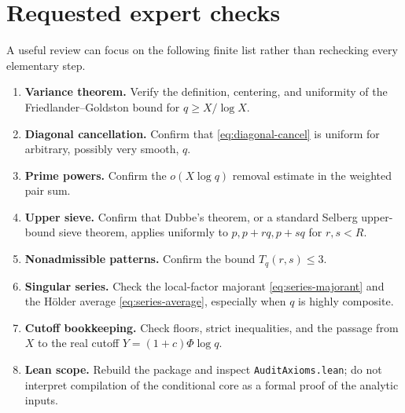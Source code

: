 \documentclass[11pt]{article}
\theoremstyle{definition}
\theoremstyle{remark}
\begin{document}
\begin{center}
\end{center}

\section{Requested expert checks}

A useful review can focus on the following finite list rather than rechecking every elementary step.

\begin{enumerate}[leftmargin=2.4em]
  \item \textbf{Variance theorem.} Verify the definition, centering, and uniformity of the Friedlander--Goldston bound for $q\ge X/\log X$.
  \item \textbf{Diagonal cancellation.} Confirm that \eqref{eq:diagonal-cancel} is uniform for arbitrary, possibly very smooth, $q$.
  \item \textbf{Prime powers.} Confirm the $o(X\log q)$ removal estimate in the weighted pair sum.
  \item \textbf{Upper sieve.} Confirm that Dubbe's theorem, or a standard Selberg upper-bound sieve theorem, applies uniformly to $p,p+rq,p+sq$ for $r,s<R$.
  \item \textbf{Nonadmissible patterns.} Confirm the bound $T_q(r,s)\le3$.
  \item \textbf{Singular series.} Check the local-factor majorant \eqref{eq:series-majorant} and the H\"older average \eqref{eq:series-average}, especially when $q$ is highly composite.
  \item \textbf{Cutoff bookkeeping.} Check floors, strict inequalities, and the passage from $X$ to the real cutoff $Y=(1+c)\Phi\log q$.
  \item \textbf{Lean scope.} Rebuild the package and inspect \texttt{AuditAxioms.lean}; do not interpret compilation of the conditional core as a formal proof of the analytic inputs.
\end{enumerate}
\end{document}
